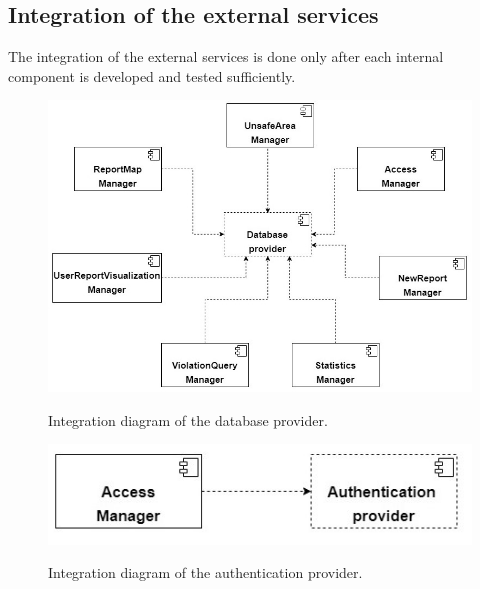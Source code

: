 \documentclass[../RASD.tex]{subfiles}
\begin{document}
    \subsection{Integration of the external services}\label{sec:integration-of-the-external-services}
    The integration of the external services is done only after each internal component is developed and tested sufficiently.
    \begin{figure}[H]
        \centering
        \includegraphics[scale = 0.8]{assets/integration_diagrams/database_provider_integration.png}\\[1.6 cm]
        \caption[\textit{Integration} Diagram of the database provider]{Integration diagram of the database provider.}
    \end{figure}

    \begin{figure}[H]
        \centering
        \includegraphics[scale = 0.8]{assets/integration_diagrams/authentication_provider_integration.png}\\[1.6 cm]
        \caption[\textit{Integration} Diagram of the authentication provider]{Integration diagram of the authentication provider.}
    \end{figure}
\end{document}
